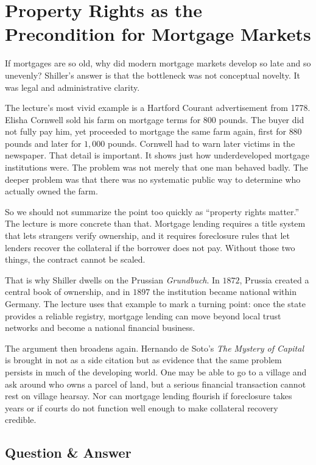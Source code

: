 \section{Property Rights as the Precondition for Mortgage Markets}

If mortgages are so old, why did modern mortgage markets develop so late and so unevenly? Shiller's answer is that the bottleneck was not conceptual novelty. It was legal and administrative clarity.

The lecture's most vivid example is a Hartford Courant advertisement from 1778. Elisha Cornwell sold his farm on mortgage terms for \(800\) pounds. The buyer did not fully pay him, yet proceeded to mortgage the same farm again, first for \(880\) pounds and later for \(1{,}000\) pounds. Cornwell had to warn later victims in the newspaper. That detail is important. It shows just how underdeveloped mortgage institutions were. The problem was not merely that one man behaved badly. The deeper problem was that there was no systematic public way to determine who actually owned the farm.

So we should not summarize the point too quickly as ``property rights matter.'' The lecture is more concrete than that. Mortgage lending requires a title system that lets strangers verify ownership, and it requires foreclosure rules that let lenders recover the collateral if the borrower does not pay. Without those two things, the contract cannot be scaled.

That is why Shiller dwells on the Prussian \emph{Grundbuch}. In \(1872\), Prussia created a central book of ownership, and in \(1897\) the institution became national within Germany. The lecture uses that example to mark a turning point: once the state provides a reliable registry, mortgage lending can move beyond local trust networks and become a national financial business.

The argument then broadens again. Hernando de Soto's \emph{The Mystery of Capital} is brought in not as a side citation but as evidence that the same problem persists in much of the developing world. One may be able to go to a village and ask around who owns a parcel of land, but a serious financial transaction cannot rest on village hearsay. Nor can mortgage lending flourish if foreclosure takes years or if courts do not function well enough to make collateral recovery credible.

\subsection{Question \& Answer}

